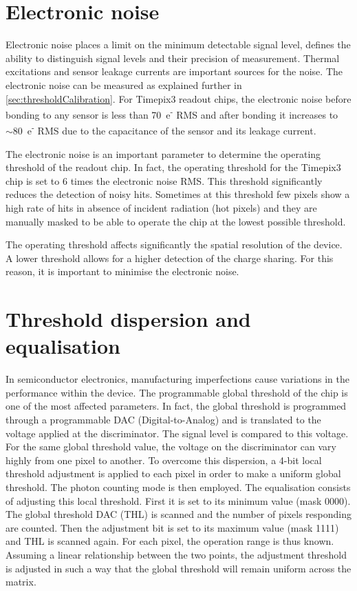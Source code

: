 \section{Electronic noise}\label{sec:noise}

Electronic noise places a limit on the minimum detectable signal
level, defines the ability to distinguish signal levels and their
precision of measurement. Thermal excitations and sensor leakage
currents are important sources for the noise. The electronic noise can
be measured as explained further in
\cref{sec:thresholdCalibration}. For Timepix3 readout chips, the
electronic noise before bonding to any sensor is less than
70~e\textsuperscript{-} RMS and after bonding it increases to
$\sim80$~e\textsuperscript{-} RMS due to the capacitance of the sensor
and its leakage current.

The electronic noise is an important parameter to determine the
operating threshold of the readout chip. In fact, the operating
threshold for the Timepix3 chip is set to 6 times the electronic noise
RMS. This threshold significantly reduces the detection of noisy
hits. Sometimes at this threshold few pixels show a high rate of hits
in absence of incident radiation (hot pixels) and they are manually
masked to be able to operate the chip at the lowest possible
threshold.

The operating threshold affects significantly the spatial resolution
of the device. A lower threshold allows for a higher detection of the
charge sharing. For this reason, it is important to minimise the
electronic noise.

\section{Threshold dispersion and equalisation} 
\label{sec:ThresholdEqualisation}


In semiconductor electronics, manufacturing imperfections cause
variations in the performance within the device. The programmable
global threshold of the chip is one of the most affected
parameters. In fact, the global threshold is programmed through a
programmable DAC (Digital-to-Analog) and is translated to the voltage
applied at the discriminator. The signal level is compared to this
voltage. For the same global threshold value, the voltage on the
discriminator can vary highly from one pixel to another. To overcome
this dispersion, a 4-bit local threshold adjustment is applied to each
pixel in order to make a uniform global threshold. The photon counting
mode is then employed. The equalisation consists of adjusting this
local threshold. First it is set to its minimum value (mask 0000). The
global threshold DAC (THL) is scanned and the number of pixels
responding are counted. Then the adjustment bit is set to its maximum
value (mask 1111) and THL is scanned again. For each pixel, the
operation range is thus known. Assuming a linear relationship between
the two points, the adjustment threshold is adjusted in such a way
that the global threshold will remain uniform across the matrix.

